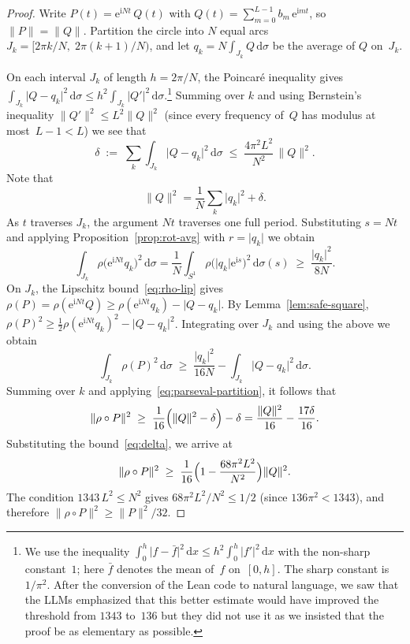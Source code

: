 \documentclass[11pt]{amsart}
\theoremstyle{remark}
\begin{document}
\begin{proof}
Write $P(t) = \mathrm{e}^{\mathrm{i} Nt}\,Q(t)$ with
$Q(t) = \sum_{m=0}^{L-1} b_m\,\mathrm{e}^{\mathrm{i} mt}$, so $\lVert P \rVert = \lVert Q \rVert$.
Partition the circle into $N$ equal arcs
$J_k = [2\pi k/N,\; 2\pi(k+1)/N)$, and let
$q_k = N\!\int_{J_k}\! Q\,\mathrm{d}\sigma$ be the average of $Q$ on~$J_k$.
 \vspace{0.5em}

On each interval $J_k$ of length $h = 2\pi/N$, the Poincar\'e
inequality gives
$\int_{J_k}\lvert Q - q_k \rvert^2\,\mathrm{d}\sigma \le h^2\int_{J_k}\lvert Q' \rvert^2\,
\mathrm{d}\sigma$.\footnote{We use the inequality
$\int_0^h \lvert f - \bar f \rvert^2\,\mathrm{d} x
\le h^2\int_0^h\lvert f' \rvert^2\,\mathrm{d} x$
with the non-sharp constant~$1$; here $\bar f$ denotes the mean of~$f$
on~$[0,h]$.  The sharp 
constant is $1/\pi^2$. After the conversion of the Lean code to natural language, we saw that the LLMs emphasized that this better estimate would have improved the threshold from $1343$ to~$136$ but they did not use it as we insisted that the proof be as elementary as possible.}
Summing over $k$ and using Bernstein's inequality $\lVert Q' \rVert^2 \le L^2\lVert Q \rVert^2$
(since every frequency of~$Q$ has modulus at most~$L{-}1 < L$) we see that
\begin{equation}\label{eq:delta}
\delta \;:=\; \sum_{k} \int_{J_k}\lvert Q - q_k \rvert^2\,\mathrm{d}\sigma
\;\le\; \frac{4\pi^2 L^2}{N^2}\,\lVert Q \rVert^2.
\end{equation}
Note that
\begin{equation}\label{eq:parseval-partition}
\lVert Q \rVert^2
= \frac{1}{N}\sum_{k}\lvert q_k \rvert^2 + \delta.
\end{equation}
As $t$ traverses $J_k$, the argument $Nt$ traverses one full period.
Substituting $s = Nt$ and applying Proposition~\ref{prop:rot-avg} with
$r = \lvert q_k \rvert$ we obtain
\[
\int_{J_k}\rho\bigl(\mathrm{e}^{\mathrm{i} Nt} q_k\bigr)^2\,\mathrm{d}\sigma
= \frac{1}{N}\int_{S^1}\rho\bigl(\lvert q_k \rvert\mathrm{e}^{\mathrm{i} s}\bigr)^2\,\mathrm{d}\sigma(s)
\;\ge\; \frac{\lvert q_k \rvert^2}{8N}.
\]
On $J_k$, the Lipschitz bound~\eqref{eq:rho-lip} gives
$\rho(P) = \rho(\mathrm{e}^{\mathrm{i} Nt}Q)
\ge \rho(\mathrm{e}^{\mathrm{i} Nt}q_k) - \lvert Q - q_k \rvert$.
By Lemma~\ref{lem:safe-square},
$\rho(P)^2 \ge \tfrac{1}{2}\rho(\mathrm{e}^{\mathrm{i} Nt}q_k)^2 - \lvert Q - q_k \rvert^2$.
Integrating over $J_k$ and using the above we obtain
\[
\int_{J_k}\rho(P)^2\,\mathrm{d}\sigma
\;\ge\; \frac{\lvert q_k \rvert^2}{16N} - \int_{J_k}\lvert Q-q_k \rvert^2\,\mathrm{d}\sigma.
\]
Summing over $k$ and applying~\eqref{eq:parseval-partition}, it follows that
\[
\lVert \rho \circ P \rVert^2
\;\ge\; \frac{1}{16}\Bigl(\lVert Q \rVert^2 - \delta\Bigr) - \delta
= \frac{\lVert Q \rVert^2}{16} - \frac{17\delta}{16}.
\]
Substituting the bound~\eqref{eq:delta}, we arrive at
\[
\lVert \rho \circ P \rVert^2
\;\ge\;
\frac{1}{16}\Bigl(1 - \frac{68\pi^2 L^2}{N^2}\Bigr)\lVert Q \rVert^2.
\]
The condition $1343\,L^2 \le N^2$ gives $68\pi^2 L^2/N^2 \le 1/2$
(since $136\pi^2 < 1343$), and therefore
$\lVert \rho \circ P \rVert^2 \ge \lVert P \rVert^2/32$.
\end{proof}
\end{document}
